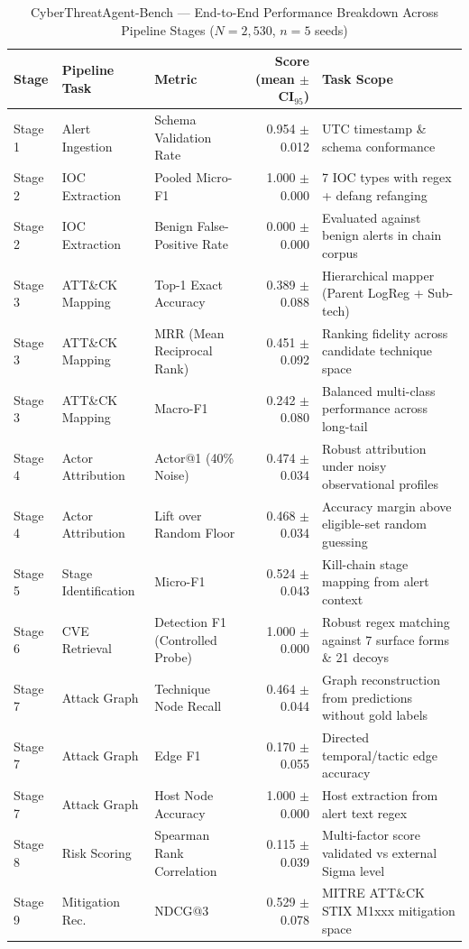 \begin{table}[t]
\centering
\caption{CyberThreatAgent-Bench --- End-to-End Performance Breakdown Across Pipeline Stages ($N=2{,}530$, $n=5$ seeds)}
\label{tab:pipeline_summary}
\begin{tabular}{lllrl}
\toprule
Stage & Pipeline Task & Metric & Score (mean $\pm$ CI$_{95}$) & Task Scope \\ \midrule
Stage 1 & Alert Ingestion & Schema Validation Rate & 0.954 $\pm$ 0.012 & UTC timestamp \& schema conformance \\
Stage 2 & IOC Extraction & Pooled Micro-F1 & 1.000 $\pm$ 0.000 & 7 IOC types with regex + defang refanging \\
Stage 2 & IOC Extraction & Benign False-Positive Rate & 0.000 $\pm$ 0.000 & Evaluated against benign alerts in chain corpus \\
Stage 3 & ATT\&CK Mapping & Top-1 Exact Accuracy & 0.389 $\pm$ 0.088 & Hierarchical mapper (Parent LogReg + Sub-tech) \\
Stage 3 & ATT\&CK Mapping & MRR (Mean Reciprocal Rank) & 0.451 $\pm$ 0.092 & Ranking fidelity across candidate technique space \\
Stage 3 & ATT\&CK Mapping & Macro-F1 & 0.242 $\pm$ 0.080 & Balanced multi-class performance across long-tail \\
Stage 4 & Actor Attribution & Actor@1 (40\% Noise) & 0.474 $\pm$ 0.034 & Robust attribution under noisy observational profiles \\
Stage 4 & Actor Attribution & Lift over Random Floor & 0.468 $\pm$ 0.034 & Accuracy margin above eligible-set random guessing \\
Stage 5 & Stage Identification & Micro-F1 & 0.524 $\pm$ 0.043 & Kill-chain stage mapping from alert context \\
Stage 6 & CVE Retrieval & Detection F1 (Controlled Probe) & 1.000 $\pm$ 0.000 & Robust regex matching against 7 surface forms \& 21 decoys \\
Stage 7 & Attack Graph & Technique Node Recall & 0.464 $\pm$ 0.044 & Graph reconstruction from predictions without gold labels \\
Stage 7 & Attack Graph & Edge F1 & 0.170 $\pm$ 0.055 & Directed temporal/tactic edge accuracy \\
Stage 7 & Attack Graph & Host Node Accuracy & 1.000 $\pm$ 0.000 & Host extraction from alert text regex \\
Stage 8 & Risk Scoring & Spearman Rank Correlation & 0.115 $\pm$ 0.039 & Multi-factor score validated vs external Sigma level \\
Stage 9 & Mitigation Rec. & NDCG@3 & 0.529 $\pm$ 0.078 & MITRE ATT\&CK STIX M1xxx mitigation space \\
\bottomrule
\end{tabular}
\end{table}
